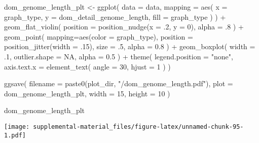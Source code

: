 \documentclass[
]{book}
\newenvironment{Shaded}{\begin{snugshade}}{\end{snugshade}}
\newcommand{\AttributeTok}[1]{\textcolor[rgb]{0.77,0.63,0.00}{#1}}
\newcommand{\ConstantTok}[1]{\textcolor[rgb]{0.00,0.00,0.00}{#1}}
\newcommand{\DecValTok}[1]{\textcolor[rgb]{0.00,0.00,0.81}{#1}}
\newcommand{\FloatTok}[1]{\textcolor[rgb]{0.00,0.00,0.81}{#1}}
\newcommand{\FunctionTok}[1]{\textcolor[rgb]{0.00,0.00,0.00}{#1}}
\newcommand{\NormalTok}[1]{#1}
\newcommand{\OtherTok}[1]{\textcolor[rgb]{0.56,0.35,0.01}{#1}}
\newcommand{\SpecialCharTok}[1]{\textcolor[rgb]{0.00,0.00,0.00}{#1}}
\newcommand{\StringTok}[1]{\textcolor[rgb]{0.31,0.60,0.02}{#1}}
\begin{document}
\begin{Shaded}
\begin{Highlighting}[]
\NormalTok{dom\_genome\_length\_plt }\OtherTok{\textless{}{-}} \FunctionTok{ggplot}\NormalTok{(}
    \AttributeTok{data =}\NormalTok{ data,}
    \AttributeTok{mapping =} \FunctionTok{aes}\NormalTok{(}
      \AttributeTok{x =}\NormalTok{ graph\_type,}
      \AttributeTok{y =}\NormalTok{ dom\_detail\_genome\_length,}
      \AttributeTok{fill =}\NormalTok{ graph\_type}
\NormalTok{    )}
\NormalTok{  ) }\SpecialCharTok{+}
  \FunctionTok{geom\_flat\_violin}\NormalTok{(}
    \AttributeTok{position =} \FunctionTok{position\_nudge}\NormalTok{(}\AttributeTok{x =}\NormalTok{ .}\DecValTok{2}\NormalTok{, }\AttributeTok{y =} \DecValTok{0}\NormalTok{),}
    \AttributeTok{alpha =}\NormalTok{ .}\DecValTok{8}
\NormalTok{  ) }\SpecialCharTok{+}
  \FunctionTok{geom\_point}\NormalTok{(}
    \AttributeTok{mapping=}\FunctionTok{aes}\NormalTok{(}\AttributeTok{color =}\NormalTok{ graph\_type),}
    \AttributeTok{position =} \FunctionTok{position\_jitter}\NormalTok{(}\AttributeTok{width =}\NormalTok{ .}\DecValTok{15}\NormalTok{),}
    \AttributeTok{size =}\NormalTok{ .}\DecValTok{5}\NormalTok{,}
    \AttributeTok{alpha =} \FloatTok{0.8}
\NormalTok{  ) }\SpecialCharTok{+}
  \FunctionTok{geom\_boxplot}\NormalTok{(}
    \AttributeTok{width =}\NormalTok{ .}\DecValTok{1}\NormalTok{,}
    \AttributeTok{outlier.shape =} \ConstantTok{NA}\NormalTok{,}
    \AttributeTok{alpha =} \FloatTok{0.5}
\NormalTok{  ) }\SpecialCharTok{+}
  \FunctionTok{theme}\NormalTok{(}
    \AttributeTok{legend.position =} \StringTok{"none"}\NormalTok{,}
    \AttributeTok{axis.text.x =} \FunctionTok{element\_text}\NormalTok{(}
      \AttributeTok{angle =} \DecValTok{30}\NormalTok{,}
      \AttributeTok{hjust =} \DecValTok{1}
\NormalTok{    )}
\NormalTok{  )}

\FunctionTok{ggsave}\NormalTok{(}
  \AttributeTok{filename =} \FunctionTok{paste0}\NormalTok{(plot\_dir, }\StringTok{"/dom\_genome\_length.pdf"}\NormalTok{),}
  \AttributeTok{plot =}\NormalTok{ dom\_genome\_length\_plt,}
  \AttributeTok{width =} \DecValTok{15}\NormalTok{,}
  \AttributeTok{height =} \DecValTok{10}
\NormalTok{)}

\NormalTok{dom\_genome\_length\_plt}
\end{Highlighting}
\end{Shaded}

\texttt{[image: supplemental-material\_files/figure-latex/unnamed-chunk-95-1.pdf]}
\end{document}
